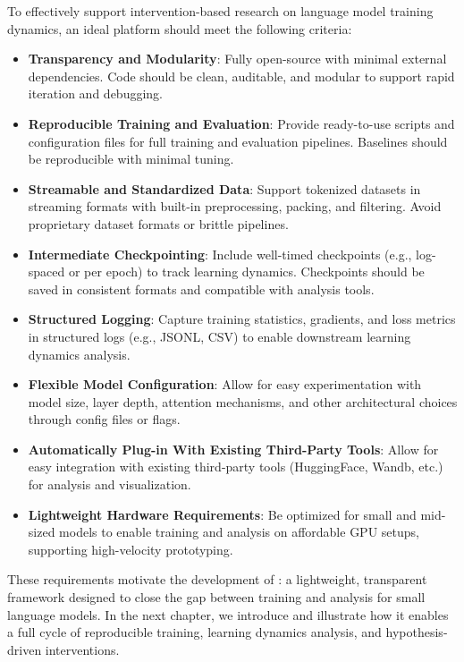 \begin{tcolorbox}[
    colback=white,
    colframe=thesisblue,
    title=\textbf{Design Requirements for Intervention-Friendly Language Model Platforms},
    fonttitle=\bfseries,
    coltitle=white,
    arc=0mm,
    boxrule=1pt,
    left=10pt,
    right=10pt,
    top=10pt,
    bottom=10pt,
    enhanced,
    breakable
]
To effectively support intervention-based research on language model training dynamics, an ideal platform should meet the following criteria:

\begin{itemize}[label=\cmark]
    \item \textbf{Transparency and Modularity}: Fully open-source with minimal external dependencies. Code should be clean, auditable, and modular to support rapid iteration and debugging.
    
    \item \textbf{Reproducible Training and Evaluation}: Provide ready-to-use scripts and configuration files for full training and evaluation pipelines. Baselines should be reproducible with minimal tuning.
    
    \item \textbf{Streamable and Standardized Data}: Support tokenized datasets in streaming formats with built-in preprocessing, packing, and filtering. Avoid proprietary dataset formats or brittle pipelines.
    
    \item \textbf{Intermediate Checkpointing}: Include well-timed checkpoints (e.g., log-spaced or per epoch) to track learning dynamics. Checkpoints should be saved in consistent formats and compatible with analysis tools.
    
    \item \textbf{Structured Logging}: Capture training statistics, gradients, and loss metrics in structured logs (e.g., JSONL, CSV) to enable downstream learning dynamics analysis.
    
    \item \textbf{Flexible Model Configuration}: Allow for easy experimentation with model size, layer depth, attention mechanisms, and other architectural choices through config files or flags.

    \item \textbf{Automatically Plug-in With Existing Third-Party Tools}: Allow for easy integration with existing third-party tools (HuggingFace, Wandb, etc.) for analysis and visualization.

    
    \item \textbf{Lightweight Hardware Requirements}: Be optimized for small and mid-sized models to enable training and analysis on affordable GPU setups, supporting high-velocity prototyping.
\end{itemize}
\end{tcolorbox}

These requirements motivate the development of \pico: a lightweight, transparent framework designed to close the gap between training and analysis for small language models. In the next chapter, we introduce \pico and illustrate how it enables a full cycle of reproducible training, learning dynamics analysis, and hypothesis-driven interventions.


